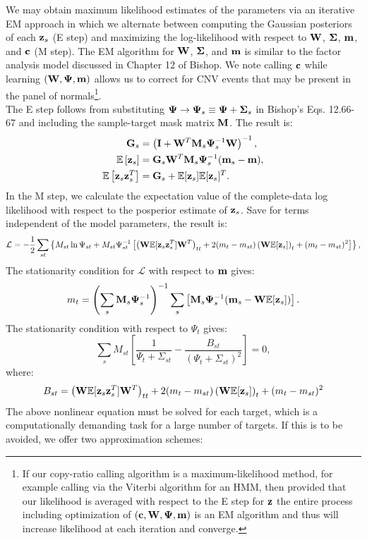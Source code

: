 \documentclass[nofootinbib,amssymb,amsmath]{revtex4}
\newcommand{\vI}{{\bf I}}
\newcommand{\vc}{{\bf c}}
\newcommand{\vz}{{\bf z}}
\newcommand{\vm}{{\bf m}}
\newcommand{\vG}{{\bf G}}
\newcommand{\vM}{{\bf M}}
\newcommand{\vW}{{\bf W}}
\newcommand{\vPsi}{{\bf \Psi}}
\newcommand{\vSigma}{{\bf \Sigma}}
\newcommand{\EE}{\mathbb{E}}
\begin{document}
We may obtain maximum likelihood estimates of the parameters via an iterative EM approach in which we alternate between computing the Gaussian posteriors of each $\vz_s$ (E step) and maximizing the log-likelihood with respect to $\vW$, $\vSigma$, $\vm$, and $\vc$ (M step). The EM algorithm for $\vW$, $\vSigma$, and $\vm$ is similar to the factor analysis model discussed in Chapter 12 of Bishop. We note calling $\vc$ while learning $(\vW, \vPsi, \vm)$ allows us to correct for CNV events that may be present in the panel of normals\footnote{If our copy-ratio calling algorithm is a maximum-likelihood method, for example calling via the Viterbi algorithm for an HMM, then provided that our likelihood is averaged with respect to the E step for $\vz$ the entire process including optimization of $(\vc, \vW, \vPsi, \vm)$ is an EM algorithm and thus will increase likelihood at each iteration and converge.}.\\

The E step follows from substituting $\vPsi \rightarrow \vPsi_s \equiv  \vPsi + \vSigma_s$ in Bishop's Eqs. 12.66-67 and including the sample-target mask matrix $\vM$. The result is:
\begin{align}
\vG_s &= \left( \vI + \vW^T \vM_s \vPsi_s^{-1} \vW \right)^{-1}, \nonumber\\
\EE \left[ \vz_s \right] &= \vG_s \vW^T \vM_s \vPsi_s^{-1} (\vm_s - \vm), \nonumber\\
\EE \left[ \vz_s \vz_s^T \right] &= \vG_s + \EE[\vz_s] \EE[\vz_s]^T.
\end{align}
%
In the M step, we calculate the expectation value of the complete-data log likelihood with respect to the posperior estimate of $\vz_s$. Save for terms independent of the model parameters, the result is:
%
\begin{equation}
\mathcal{L} = -\frac{1}{2} \sum_{st} \left\{ M_{st} \ln \Psi_{st} + M_{st} \Psi_{st}^{-1} \left[  \left( \vW \EE[\vz_s \vz_s^T] \vW^T \right)_{tt} +2 (m_t - m_{st}) \left( \vW \EE[\vz_s] \right)_t + (m_t - m_{st})^2 \right] \right\},
\end{equation}
%
The stationarity condition for $\mathcal{L}$ with respect to $\vm$ gives: 
\begin{align}
m_t = \left(\sum_s \vM_s \vPsi_{s}^{-1} \right)^{-1} \sum_s \left[ \vM_s \vPsi_{s}^{-1}  (\vm_{s}  - \vW  \EE[\vz_{s}] ) \right].
\end{align}
The stationarity condition with respect to $\Psi_t$ gives:
\begin{equation}\label{eq:psi_stationarity}
\sum_s M_{st}\left[\frac{1}{\Psi_t + \Sigma_{st}} - \frac{B_{st}}{(\Psi_t + \Sigma_{st})^2} \right] = 0,
\end{equation}
where:
\begin{equation}
B_{st} = \left( \vW \EE[\vz_s \vz_s^T] \vW^T \right)_{tt} +2 (m_t - m_{st}) \left( \vW \EE[\vz_s] \right)_t + (m_t - m_{st})^2
\end{equation}
The above nonlinear equation must be solved for each target, which is a computationally demanding task for a large number of targets. If this is to be avoided, we offer two approximation schemes:\\
\end{document}
